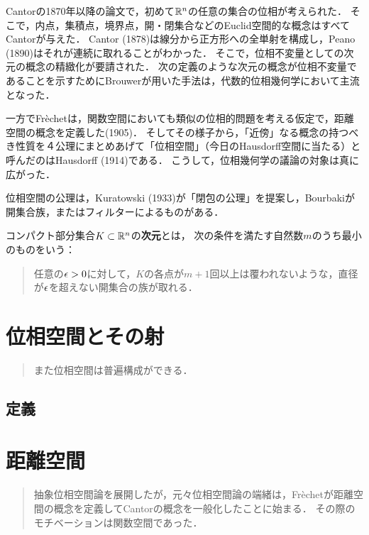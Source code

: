 \documentclass[uplatex,dvipdfmx]{jsreport}
\begin{document}
\begin{history}
    Cantorの1870年以降の論文で，初めて$\mathbb{R}^n$の任意の集合の位相が考えられた．
    そこで，内点，集積点，境界点，開・閉集合などのEuclid空間的な概念はすべてCantorが与えた．
    Cantor (1878)は線分から正方形への全単射を構成し，Peano (1890)はそれが連続に取れることがわかった．
    そこで，位相不変量としての次元の概念の精緻化が要請された．
    次の定義のような次元の概念が位相不変量であることを示すためにBrouwerが用いた手法は，代数的位相幾何学において主流となった．

    一方でFr\`{e}chetは，関数空間においても類似の位相的問題を考える仮定で，距離空間の概念を定義した(1905)．
    そしてその様子から，「近傍」なる概念の持つべき性質を４公理にまとめあげて「位相空間」（今日のHausdorff空間に当たる）と呼んだのはHausdorff (1914)である．
    こうして，位相幾何学の議論の対象は真に広がった．

    位相空間の公理は，Kuratowski (1933)が「閉包の公理」を提案し，Bourbakiが開集合族，またはフィルターによるものがある．
    
\end{history}

\begin{definition}
    コンパクト部分集合$K\subset\mathbb{R}^n$の\textbf{次元}とは，
    次の条件を満たす自然数$m$のうち最小のものをいう：
    \begin{quote}
        任意の$\epsilon>0$に対して，$K$の各点が$m+1$回以上は覆われないような，直径が$\epsilon$を超えない開集合の族が取れる．
    \end{quote}
\end{definition}

\chapter{位相空間とその射}

\begin{quotation}
    また位相空間は普遍構成ができる．
\end{quotation}

\section{定義}

\chapter{距離空間}

\begin{quotation}
    抽象位相空間論を展開したが，元々位相空間論の端緒は，Fr\`{e}chetが距離空間の概念を定義してCantorの概念を一般化したことに始まる．
    その際のモチベーションは関数空間であった．
\end{quotation}
\end{document}
